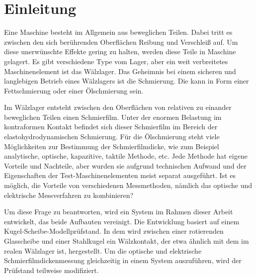 \chapter{Einleitung}
\label{chap:einleitung}

Eine Maschine besteht im Allgemein aus beweglichen Teilen.
Dabei tritt es zwischen den sich berührenden Oberflächen Reibung und Verschleiß auf.
Um diese unerwünschte Effekte gering zu halten, werden diese Teile in Maschine gelagert.
Es gibt verschiedene Type vom Lager, aber ein weit verbreitetes Maschinenelement ist das Wälzlager.
Das Geheimnis bei einem sicheren und langlebigen Betrieb eines Wälzlagers ist die Schmierung.
Die kann in Form einer Fettschmierung oder einer Ölschmierung sein.

Im Wälzlager entsteht zwischen den Oberflächen von relativen zu einander beweglichen Teilen einen Schmierfilm.
Unter der enormen Belastung im kontraformen Kontakt befindet sich dieser Schmierfilm im Bereich der elastohydrodynamischen Schmierung.
Für die Ölschmierung steht viele Möglichkeiten zur Bestimmung der Schmierfilmdicke, wie zum Beispiel analytische, optische, kapazitive, taktile Methode, etc.
Jede Methode hat eigene Vorteile und Nachteile, aber wurden sie aufgrund technischen Aufwand und der Eigenschaften der Test-Maschinenelementen meist separat ausgeführt.
Ist es möglich, die Vorteile von verschiedenen Messmethoden, nämlich das optische und elektrische Messverfahren zu kombinieren?

Um diese Frage zu beantworten, wird ein System im Rahmen dieser Arbeit entwickelt, das beide Aufbauten vereinigt.
Die Entwicklung basiert auf einem Kugel-Scheibe-Modellprüfstand.
In dem wird zwischen einer rotierenden Glasscheibe und einer Stahlkugel ein Wälzkontakt, der etwa ähnlich mit dem im realen Wälzlager ist, hergestellt.
Um die optische und elektrische Schmierfilmdickenmessung gleichzeitig in einem System auszuführen, wird der Prüfstand teilweise modifiziert.

